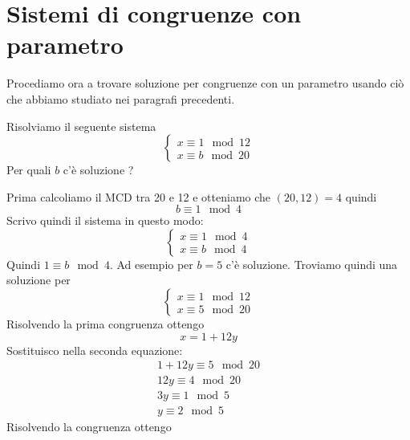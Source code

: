 \section{Sistemi di congruenze con parametro}
Procediamo ora a trovare soluzione per congruenze con un parametro usando ci\`o che abbiamo studiato
nei paragrafi precedenti.

\begin{example}
	Risolviamo il seguente sistema
	\begin{equation*}
		\begin{cases}
			x \equiv 1 \mod{12} \\
			x \equiv b \mod{20}
		\end{cases}
	\end{equation*}
	Per quali $b$ c'\`e soluzione ?

	Prima calcoliamo il MCD tra 20 e 12 e otteniamo che $(20, 12) = 4$ quindi
	\begin{equation*}
		b \equiv 1 \mod{4}
	\end{equation*}
	Scrivo quindi il sistema in questo modo:
	\begin{equation*}
		\begin{cases}
			x \equiv 1 \mod{4} \\
			x \equiv b \mod{4}
		\end{cases}
	\end{equation*}
	Quindi $1 \equiv b \mod{4}$. Ad esempio per $b = 5$ c'\`e soluzione. Troviamo quindi una
	soluzione per
	\begin{equation*}
		\begin{cases}
			x \equiv 1 \mod{12} \\
			x \equiv 5 \mod{20}
		\end{cases}
	\end{equation*}
	Risolvendo la prima congruenza ottengo
	\begin{equation*}
		x = 1 + 12y
	\end{equation*}
	Sostituisco nella seconda equazione:
	\begin{equation*}
		\begin{array}{l}
			1 + 12y \equiv 5 \mod{20} \\
			12y \equiv 4 \mod{20}     \\
			3y \equiv 1 \mod{5}       \\
			y \equiv 2 \mod{5}
		\end{array}
	\end{equation*}
	Risolvendo la congruenza ottengo
	\begin{equation*}

\end{equation*}
\end{example}
